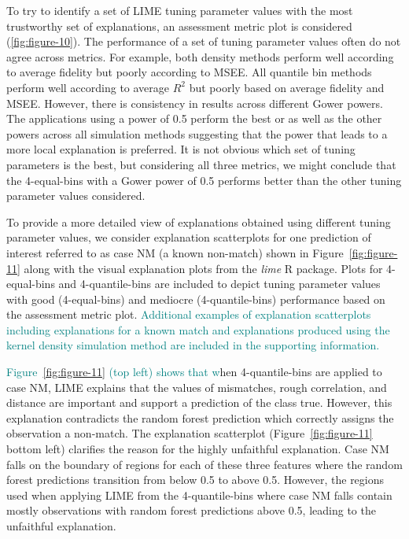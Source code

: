 \documentclass[AMS,STIX2COL]{WileyNJD-v2}\usepackage[]{graphicx}\usepackage[]{color}
\newcommand{\kge}[1]{\textcolor{teal}{#1}}
\renewcommand{\sout}[1]{\unskip}
\begin{document}
To try to identify a set of LIME tuning parameter values with the most trustworthy set of explanations, an assessment metric plot is considered (\autoref{fig:figure-10}). The performance of a set of tuning parameter values often do not agree across metrics. For example, both density methods perform well according to average fidelity but poorly according to MSEE. All quantile bin methods perform well according to average $R^2$ but poorly based on average fidelity and MSEE. However, there is consistency in results across different Gower powers. The applications using a power of 0.5 perform the best or as well as the other powers across all simulation methods suggesting that the power that leads to a more local explanation is preferred. It is not obvious  which set of tuning parameters is the best, but considering all three metrics, we might conclude that the 4-equal-bins with a Gower power of 0.5 performs better than the other tuning parameter values considered.

To provide a more detailed view of explanations obtained using different tuning parameter values, we consider explanation scatterplots for one prediction of interest referred to as case NM (a known non-match) shown in Figure~\ref{fig:figure-11} along with the visual explanation plots from the \emph{lime} R package. Plots for 4-equal-bins and 4-quantile-bins are included to depict tuning parameter values with good (4-equal-bins) and mediocre (4-quantile-bins) performance based on the assessment metric plot. \kge{Additional examples of explanation scatterplots including explanations for a known match and explanations produced using the kernel density simulation method are included in the supporting information.} \sout{Explanation scatterplots for a known match, referred to as case M, and for the kernel density simulation method applied to both M and NM are included in Appendix~\ref{bullets-plus}.} 

\kge{Figure~\ref{fig:figure-11} (top left) shows that w}\sout{W}hen 4-quantile-bins are applied to case NM, LIME explains that the values of mismatches, rough correlation, and distance are important and support a prediction of the class true\sout{ (Figure~\ref{fig:figure-11} top left)}. However, this explanation contradicts the random forest prediction which correctly assigns the observation  a non-match. The explanation scatterplot (Figure~\ref{fig:figure-11} bottom left) clarifies the reason for the highly unfaithful explanation. Case NM falls on the boundary of regions for each of these three features where the random forest predictions transition from below 0.5 to above 0.5. However, the regions used when applying LIME from the 4-quantile-bins where case NM falls contain mostly observations with random forest predictions above 0.5, leading to the unfaithful explanation.
\end{document}
